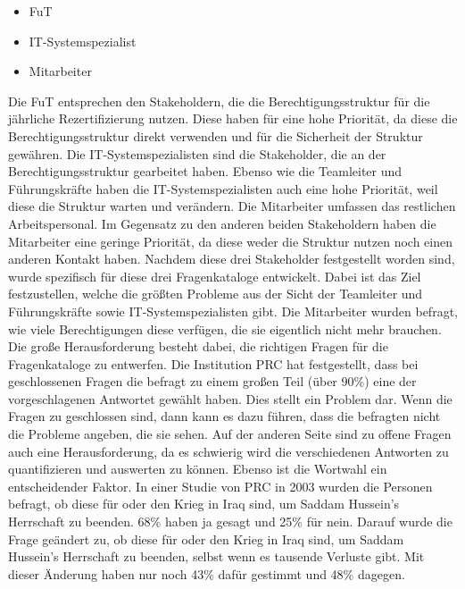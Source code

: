 \begin{itemize}
	\item \ac{FuT}
	\item IT-Systemspezialist
	\item Mitarbeiter
\end{itemize}
Die \ac{FuT} entsprechen den Stakeholdern, die die Berechtigungsstruktur für die jährliche Rezertifizierung nutzen.
Diese haben für eine hohe Priorität, da diese die Berechtigungsstruktur direkt verwenden und für die Sicherheit der Struktur gewähren.
\newline
Die IT-Systemspezialisten sind die Stakeholder, die an der Berechtigungsstruktur gearbeitet haben.
Ebenso wie die Teamleiter und Führungskräfte haben die IT-Systemspezialisten auch eine hohe Priorität, weil diese die Struktur warten und verändern.
\newline
Die Mitarbeiter umfassen das restlichen Arbeitspersonal.
Im Gegensatz zu den anderen beiden Stakeholdern haben die Mitarbeiter eine geringe Priorität, da diese weder die Struktur nutzen noch einen anderen Kontakt haben.
\newline
\newline
Nachdem diese drei Stakeholder festgestellt worden sind, wurde spezifisch für diese drei Fragenkataloge entwickelt.
Dabei ist das Ziel festzustellen, welche die größten Probleme aus der Sicht der Teamleiter und Führungskräfte sowie IT-Systemspezialisten gibt.
Die Mitarbeiter wurden befragt, wie viele Berechtigungen diese verfügen, die sie eigentlich nicht mehr brauchen.
Die große Herausforderung besteht dabei, die richtigen Fragen für die Fragenkataloge zu entwerfen.
Die Institution \ac{PRC} hat festgestellt, dass bei geschlossenen Fragen die befragt zu einem großen Teil (über 90\%) eine der vorgeschlagenen Antwortet gewählt haben. \cite{Survey}
Dies stellt ein Problem dar.
Wenn die Fragen zu geschlossen sind, dann kann es dazu führen, dass die befragten nicht die Probleme angeben, die sie sehen.
Auf der anderen Seite sind zu offene Fragen auch eine Herausforderung, da es schwierig wird die verschiedenen Antworten zu quantifizieren und auswerten zu können.
Ebenso ist die Wortwahl ein entscheidender Faktor.
In einer Studie von \ac{PRC} in 2003 wurden die Personen befragt, ob diese für oder den Krieg in Iraq sind, um Saddam Hussein's Herrschaft zu beenden.
68\% haben ja gesagt und 25\% für nein.
Darauf wurde die Frage geändert zu, ob diese für oder den Krieg in Iraq sind, um Saddam Hussein's Herrschaft zu beenden, selbst wenn es tausende Verluste gibt.
Mit dieser Änderung haben nur noch 43\% dafür gestimmt und 48\% dagegen. \cite{Survey}
